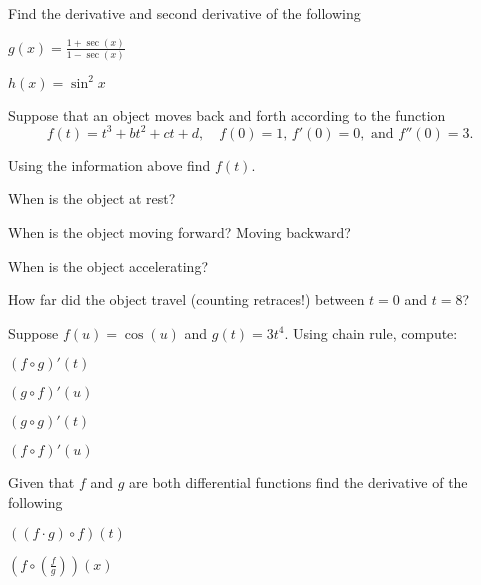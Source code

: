 \documentclass[unboxed]{hwset}
\begin{document}
\begin{problem}[1.] 
	Find the derivative and second derivative of the following
	\be
		\item $g(x) = \frac{1+\sec(x)}{1-\sec(x)}$
		\item $h(x) = \sin^2 x$
	\ee
\end{problem}

\begin{problem}[2.]
	Suppose that an object moves back and forth according to the function
	\begin{equation*}
		f(t)=t^{3}+bt^{2}+ct+d,\quad f(0)=1,\, f'(0)=0, \text{ and } f''(0)=3.
	\end{equation*}
	\be
		\item Using the information above find $f(t)$.
		\item When is the object at rest?
		\item When is the object moving forward? Moving backward?
		\item When is the object accelerating?
		\item	How far did the object travel (counting retraces!) between $t=0$ and
		$t=8$?
	\ee
\end{problem}

\begin{problem}[3.] 
	Suppose $f(u)=\cos(u)$ and $g(t)=3t^{4}$. Using chain rule, compute:
	\be
		\item $(f\circ g)'(t)$
		\item $(g\circ f)'(u)$
		\item $(g\circ g)'(t)$
		\item $(f\circ f)'(u)$
	\ee
\end{problem}

\begin{problem}[4.]
	Given that $f$ and $g$ are both differential functions find the derivative of
	the following
	\be
		\item $\left((f\cdot g)\circ f\right)(t)$
		\item $\left(f \circ \left(\frac{f}{g}\right)\right)(x)$
	\ee
\end{problem}
\end{document}
